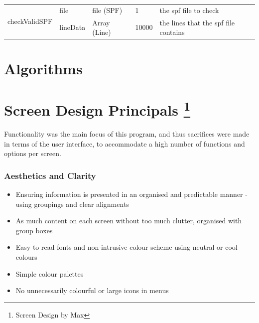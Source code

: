 \documentclass[oneside,openany,11pt,a4paper]{report}
\begin{document}
\begin{longtable}{|p{2cm}|p{3cm}|p{2cm}|p{1cm}|p{6cm}|}
\multirow{2}{*}{\parbox{2cm}{checkValidSPF}}
& file & file (SPF) & 1 & the spf file to check \\
& lineData & Array (Line) & 10000 & the lines that the spf file contains \\ \hline
\end{longtable}
\normalsize


\section{Algorithms}



\section[Screen Design Principals]{Screen Design Principals \footnote{Screen Design by Max}}

Functionality was the main focus of this program, and thus sacrifices were made in terms of the user interface, to accommodate a high number of functions and options per screen.
\subsubsection{Aesthetics and Clarity}
\begin{itemize}
	\itemsep0em
	\item Ensuring information is presented in an organised and predictable manner - using groupings and clear alignments
	\item As much content on each screen without too much clutter, organised with group boxes
	\item Easy to read fonts and non-intrusive colour scheme using neutral or cool colours
	\item Simple colour palettes
	\item No unnecessarily colourful or large icons in menus
\end{itemize}
\end{document}

